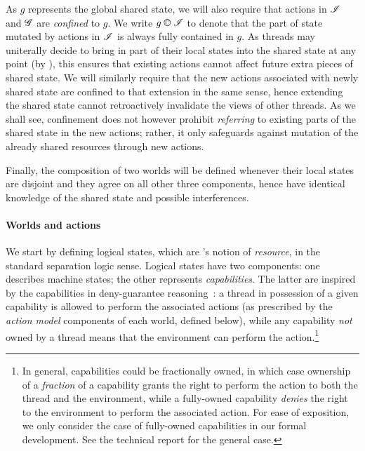 As $g$ represents the global shared state, we will also require that
actions in $\mathscr{I}$ and $\mathscr{G}$ are \emph{confined} to $g$.  We write
$g \containI \lmod$ to denote that the part of state mutated by
actions in $\mathscr{I}$ is always fully contained in $g$. As threads may
uniterally decide to bring in part of their local states into the
shared state at any point (by \extendRule), this ensures that
existing actions cannot affect future extra pieces of shared state. We
will similarly require that the new actions associated with newly
shared state are confined to that extension in the same sense, hence
extending the shared state cannot retroactively invalidate the views
of other threads. As we shall see, confinement does not however
prohibit \emph{referring} to existing parts of the shared state in the
new actions; rather, it only safeguards against mutation of the
already shared resources through new actions.

Finally, the composition of two worlds will be defined whenever their
local states are disjoint and they agree on all other three
components, hence have identical knowledge of the shared state and
possible interferences.

\paragraph{Worlds and actions}
We start by defining logical states, which are \colosl's notion of
\emph{resource}, in the standard separation logic sense. Logical
states have two components: one describes machine states; the other
represents \emph{capabilities}. The latter are inspired by the
capabilities in deny-guarantee reasoning~\cite{dg}: a thread in
possession of a given capability is allowed to perform the associated
actions (as prescribed by the \emph{action model} components of each
world, defined below), while any capability \emph{not} owned by a
thread means that the environment can perform the action.\footnote{In
  general, capabilities could be fractionally owned, in which case
  ownership of a \emph{fraction} of a capability grants the right to
  perform the action to both the thread and the environment, while a
  fully-owned capability \emph{denies} the right to the environment to
  perform the associated action. For ease of exposition, we only
  consider the case of fully-owned capabilities in our formal
  development. See the technical report for the general case.}

